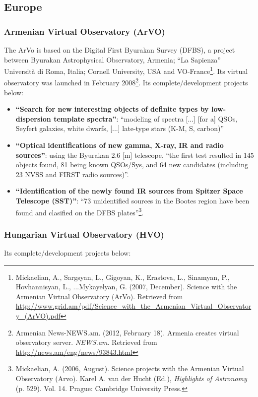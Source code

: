 \subsection{Europe}

\subsubsection{Armenian Virtual Observatory (ArVO)}
The ArVo \cite{website:arvo-home} is based on the Digital First Byurakan Survey
(DFBS), a project between Byurakan Astrophysical Observatory, Armenia; ``La
Sapienza'' Universit\`{a} di Roma, Italia; Cornell University, USA and
VO-France\footnote{Mickaelian, A., Sargsyan, L., Gigoyan, K., Erastova, L.,
Sinamyan, P., Hovhannisyan, L., ...Mykayelyan, G. (2007, December). Science with
the Armenian Virtual Observatory (ArVo).  Retrieved from
\url{http://www.grid.am/pdf/Science_with_the_Armenian_Virtual_Observatory_(ArVO).pdf}}.
Its virtual observatory was launched in February 2008\footnote{Armenian
News-NEWS.am. (2012, February 18). Armenia creates virtual observatory server.
\textit{NEWS.am}. Retrieved from \url{http://news.am/eng/news/93843.html}}. Its
complete/development projects below:

\begin{itemize}
\item \textbf{``Search for new interesting objects of definite types by
low-dispersion template spectra''}:
``modeling of spectra [...] [for a] QSOs, Seyfert galaxies, white dwarfs, [...]
late-type stars (K-M, S, carbon)'' 

\item \textbf{``Optical identifications of new gamma, X-ray, IR and radio
sources''}:
using the Byurakan 2.6 [m] telescope, ``the first test resulted in 145 objects
found, 81 being known QSOs/Sys, and 64 new candidates (including 23 NVSS and
FIRST radio sources)''.

\item \textbf{``Identification of the newly found IR sources from Spitzer Space
Telescope (SST)''}:
``73 unidentified sources in the Bootes region have been found and clasified on
the DFBS plates''\footnote{Mickaelian, A. (2006, August). Science projects with
the Armenian Virtual Observatory (Arvo). Karel A.  van der Hucht (Ed.),
\textit{Highlights of Astronomy} (p. 529). Vol. 14. Prague: Cambridge University
Press.}.
\end{itemize}

\subsubsection{Hungarian Virtual Observatory \cite{website:hvo-home} (HVO)}
Its complete/development projects below:

